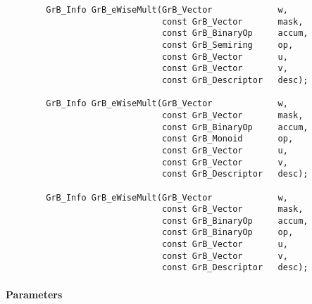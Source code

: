 \begin{verbatim}
        GrB_Info GrB_eWiseMult(GrB_Vector             w,
                               const GrB_Vector       mask,
                               const GrB_BinaryOp     accum,
                               const GrB_Semiring     op,
                               const GrB_Vector       u,
                               const GrB_Vector       v,
                               const GrB_Descriptor   desc);
                            
        GrB_Info GrB_eWiseMult(GrB_Vector             w,
                               const GrB_Vector       mask,
                               const GrB_BinaryOp     accum,
                               const GrB_Monoid       op,
                               const GrB_Vector       u,
                               const GrB_Vector       v,
                               const GrB_Descriptor   desc);

        GrB_Info GrB_eWiseMult(GrB_Vector             w,
                               const GrB_Vector       mask,
                               const GrB_BinaryOp     accum,
                               const GrB_BinaryOp     op,
                               const GrB_Vector       u,
                               const GrB_Vector       v,
                               const GrB_Descriptor   desc);
\end{verbatim}

\paragraph{Parameters}

